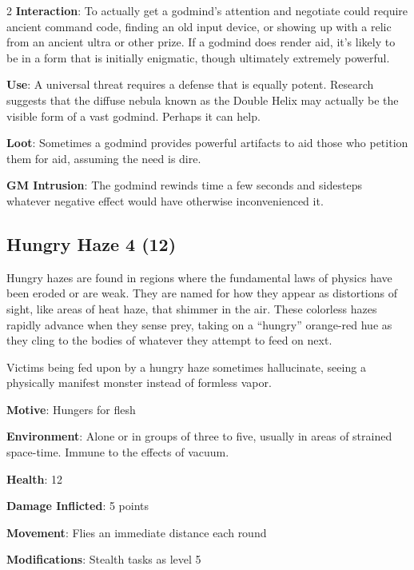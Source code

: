 \begin{multicols}{2}
\textbf{Interaction}: To actually get a godmind’s attention and negotiate could require ancient command code, finding an old input device, or showing up with a relic from an ancient ultra or other prize. If a godmind does render aid, it’s likely to be in a form that is initially enigmatic, though ultimately extremely powerful. 

\textbf{Use}: A universal threat requires a defense that is equally potent. Research suggests that the diffuse nebula known as the Double Helix may actually be the visible form of a vast godmind. Perhaps it can help.

\textbf{Loot}: Sometimes a godmind provides powerful artifacts to aid those who petition them for aid, assuming the need is dire.

\textbf{GM Intrusion}: The godmind rewinds time a few seconds and sidesteps whatever negative effect would have otherwise
inconvenienced it.

\subsection{Hungry Haze 4 (12)}

Hungry hazes are found in regions where the fundamental laws of physics have been eroded or are weak. They are named for how they appear as distortions of sight, like areas of heat haze, that shimmer in the air. These colorless hazes rapidly advance when they sense prey, taking on a “hungry” orange-red hue as they cling to the bodies of whatever they attempt to feed on next. 

Victims being fed upon by a hungry haze sometimes hallucinate, seeing a physically manifest monster instead of formless vapor.

\textbf{Motive}: Hungers for flesh 

\textbf{Environment}: Alone or in groups of three to five, usually in areas of strained space-time. Immune to the effects of vacuum. 

\textbf{Health}: 12 

\textbf{Damage Inflicted}:  5 points 

\textbf{Movement}: Flies an immediate distance each round 

\textbf{Modifications}: Stealth tasks as level 5 


\end{multicols}
